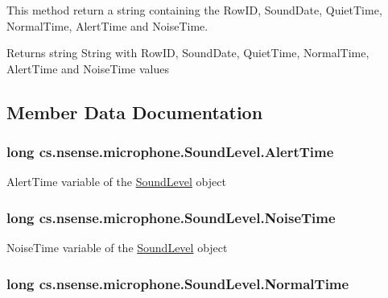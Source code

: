 This method return a string containing the Row\-I\-D, Sound\-Date, Quiet\-Time, Normal\-Time, Alert\-Time and Noise\-Time. \begin{DoxyReturn}{Returns}
string String with Row\-I\-D, Sound\-Date, Quiet\-Time, Normal\-Time, Alert\-Time and Noise\-Time values 
\end{DoxyReturn}


\subsection{Member Data Documentation}
\hypertarget{classcs_1_1nsense_1_1microphone_1_1_sound_level_a5cf8e91c9a6b6775162d499b8426bcc7}{
\subsubsection[{Alert\-Time}]{\setlength{\rightskip}{0pt plus 5cm}long cs.\-nsense.\-microphone.\-Sound\-Level.\-Alert\-Time}}\label{classcs_1_1nsense_1_1microphone_1_1_sound_level_a5cf8e91c9a6b6775162d499b8426bcc7}
Alert\-Time variable of the \hyperlink{classcs_1_1nsense_1_1microphone_1_1_sound_level}{Sound\-Level} object \hypertarget{classcs_1_1nsense_1_1microphone_1_1_sound_level_a8ee786bf5ecbd96068054fdb83561191}{
\subsubsection[{Noise\-Time}]{\setlength{\rightskip}{0pt plus 5cm}long cs.\-nsense.\-microphone.\-Sound\-Level.\-Noise\-Time}}\label{classcs_1_1nsense_1_1microphone_1_1_sound_level_a8ee786bf5ecbd96068054fdb83561191}
Noise\-Time variable of the \hyperlink{classcs_1_1nsense_1_1microphone_1_1_sound_level}{Sound\-Level} object \hypertarget{classcs_1_1nsense_1_1microphone_1_1_sound_level_aa4bd04a9baa30ff929b17d3b501d4c1d}{
\subsubsection[{Normal\-Time}]{\setlength{\rightskip}{0pt plus 5cm}long cs.\-nsense.\-microphone.\-Sound\-Level.\-Normal\-Time}}\label{classcs_1_1nsense_1_1microphone_1_1_sound_level_aa4bd04a9baa30ff929b17d3b501d4c1d}
